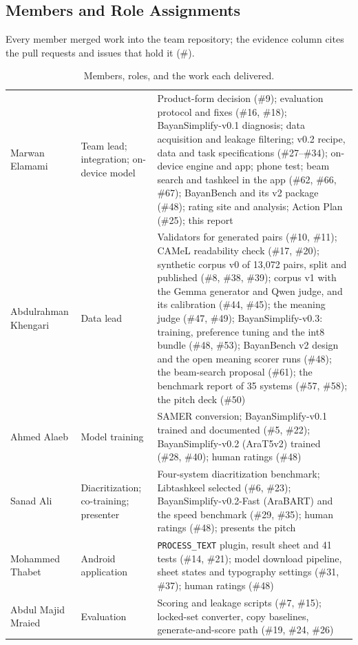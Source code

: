 \documentclass[10pt,a4paper]{article}
\newcommand{\vOne}{BayanSimplify-v0.1}
\newcommand{\vTwo}{BayanSimplify-v0.2}
\newcommand{\vTwoFast}{BayanSimplify-v0.2-Fast}
\newcommand{\vThree}{BayanSimplify-v0.3}
\begin{document}
\subsection{Members and Role Assignments}

Every member merged work into the team repository; the evidence column cites the
pull requests and issues that hold it (\#).

\begin{table}[p]
\footnotesize
\caption{Members, roles, and the work each delivered.}
\label{tab:roles}
\begin{tabularx}{\linewidth}{|p{27mm}|p{30mm}|L|}
\hline
{} &  &  \\ \hline
Marwan Elamami & Team lead; integration; on-device model &
  Product-form decision (\#9); evaluation protocol and fixes (\#16, \#18);
  \vOne{} diagnosis; data acquisition and leakage filtering; v0.2 recipe,
  data and task specifications (\#27--\#34); on-device engine and app; phone
  test; beam search and tashkeel in the app (\#62, \#66, \#67); BayanBench and its v2 package (\#48);
  rating site and analysis; Action Plan (\#25); this report \\ \hline
Abdulrahman Khengari & Data lead &
  Validators for generated pairs (\#10, \#11); CAMeL readability check (\#17,
  \#20); synthetic corpus v0 of 13,072 pairs, split and published (\#8, \#38,
  \#39); corpus v1 with the Gemma generator and Qwen judge, and its calibration
  (\#44, \#45); the meaning judge (\#47, \#49); \vThree{}: training, preference
  tuning and the int8 bundle (\#48, \#53); BayanBench v2 design and the open
  meaning scorer runs (\#48); the beam-search proposal (\#61); the benchmark
  report of 35 systems (\#57, \#58); the pitch deck (\#50) \\ \hline
Ahmed Alaeb & Model training &
  SAMER conversion; \vOne{} trained and documented (\#5, \#22); \vTwo{}
  (AraT5v2) trained (\#28, \#40); human ratings (\#48) \\ \hline
Sanad Ali & Diacritization; co-training; presenter &
  Four-system diacritization benchmark; Libtashkeel selected (\#6, \#23);
  \vTwoFast{} (AraBART) and the speed benchmark (\#29, \#35); human ratings (\#48); presents the
  pitch \\ \hline
Mohammed Thabet & Android application &
  \texttt{PROCESS\_TEXT} plugin, result sheet and 41 tests (\#14, \#21); model
  download pipeline, sheet states and typography settings (\#31, \#37); human
  ratings (\#48) \\ \hline
Abdul Majid Mraied & Evaluation &
  Scoring and leakage scripts (\#7, \#15); locked-set converter, copy
  baselines, generate-and-score path (\#19, \#24, \#26) \\ \hline
\end{tabularx}
\end{table}
\end{document}
